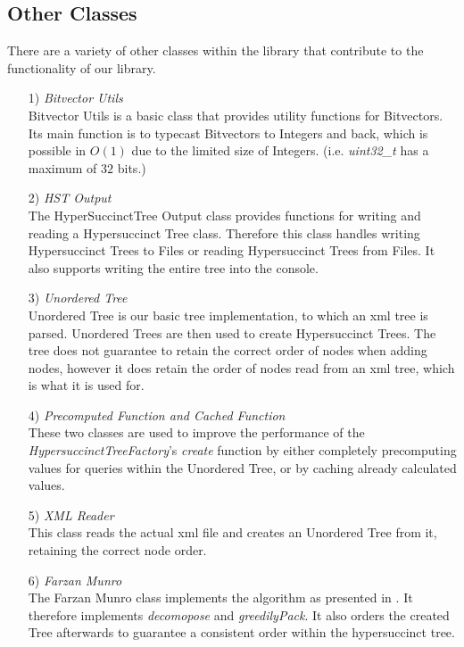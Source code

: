 \documentclass{article}
\begin{document}
\subsection{Other Classes} \label{Other Classes}
There are a variety of other classes within the library that contribute to the functionality of our library.
\begin{itemize}
	\item[1)] \textit{Bitvector Utils}\\
			Bitvector Utils is a basic class that provides utility functions for Bitvectors. Its main function is to typecast Bitvectors to Integers and back, which is possible in $O(1)$ due to the limited size of Integers. (i.e. \textit{uint32\_t} has a maximum of $32$ bits.)
	\item[2)] \textit{HST Output}\\
			The HyperSuccinctTree Output class provides functions for writing and reading a Hypersuccinct Tree class. Therefore this class handles writing Hypersuccinct Trees to Files or reading Hypersuccinct Trees from Files. It also supports writing the entire tree into the console.
	\item[3)] \textit{Unordered Tree}\\
			Unordered Tree is our basic tree implementation, to which an xml tree is parsed. Unordered Trees are then used to create Hypersuccinct Trees. The tree does not guarantee to retain the correct order of nodes when adding nodes, however it does retain the order of nodes read from an xml tree, which is what it is used for.
	\item[4)] \textit{Precomputed Function and Cached Function}\\
			These two classes are used to improve the performance of the \textit{HypersuccinctTreeFactory}'s \textit{create} function by either completely precomputing values for queries within the Unordered Tree, or by caching already calculated values.
	\item[5)] \textit{XML Reader}\\
			This class reads the actual xml file and creates an Unordered Tree from it, retaining the correct node order.
	\item[6)] \textit{Farzan Munro}\\
			The Farzan Munro class implements the algorithm as presented in \cite{farzanMunro}. It therefore implements \textit{decomopose} and \textit{greedilyPack}. It also orders the created Tree afterwards to guarantee a consistent order within the hypersuccinct tree.
\end{itemize}
\end{document}
